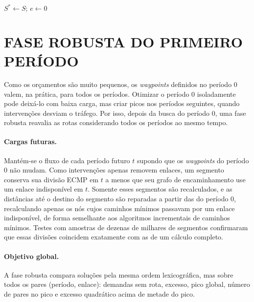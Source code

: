 \begin{algorithm}[H]
\caption{VND com perturbação em um período.}
\label{alg:vnd}
$S^* \leftarrow S$; $e \leftarrow 0$\;
\end{algorithm}

\section{\uppercase{Fase Robusta do Primeiro Período}}
\label{sec:robusta}

Como os orçamentos são muito pequenos, os \textit{waypoints} definidos no período 0 valem, na prática, para todos os períodos. Otimizar o período 0 isoladamente pode deixá-lo com baixa carga, mas criar picos nos períodos seguintes, quando intervenções desviam o tráfego. Por isso, depois da busca do período 0, uma fase robusta reavalia as rotas considerando todos os períodos ao mesmo tempo.

\paragraph{Cargas futuras.} Mantém-se o fluxo de cada período futuro $t$ supondo que os \textit{waypoints} do período 0 não mudam. Como intervenções apenas removem enlaces, um segmento conserva sua divisão ECMP em $t$ a menos que seu grafo de encaminhamento use um enlace indisponível em $t$. Somente esses segmentos são recalculados, e as distâncias até o destino do segmento são reparadas a partir das do período 0, recalculando apenas os nós cujos caminhos mínimos passavam por um enlace indisponível, de forma semelhante aos algoritmos incrementais de caminhos mínimos. Testes com amostras de dezenas de milhares de segmentos confirmaram que essas divisões coincidem exatamente com as de um cálculo completo.

\paragraph{Objetivo global.} A fase robusta compara soluções pela mesma ordem lexicográfica, mas sobre todos os pares (período, enlace): demandas sem rota, excesso, pico global, número de pares no pico e excesso quadrático acima de metade do pico.

